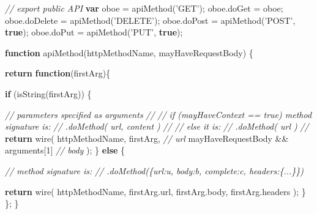\documentclass[]{article}
\newenvironment{Shaded}{}{}
\newcommand{\KeywordTok}[1]{\textcolor[rgb]{0.00,0.44,0.13}{\textbf{{#1}}}}
\newcommand{\DecValTok}[1]{\textcolor[rgb]{0.25,0.63,0.44}{{#1}}}
\newcommand{\StringTok}[1]{\textcolor[rgb]{0.25,0.44,0.63}{{#1}}}
\newcommand{\CommentTok}[1]{\textcolor[rgb]{0.38,0.63,0.69}{\textit{{#1}}}}
\newcommand{\OtherTok}[1]{\textcolor[rgb]{0.00,0.44,0.13}{{#1}}}
\newcommand{\FunctionTok}[1]{\textcolor[rgb]{0.02,0.16,0.49}{{#1}}}
\newcommand{\NormalTok}[1]{{#1}}
\begin{document}
\begin{Shaded}
\begin{Highlighting}[]
\CommentTok{// export public API}
\KeywordTok{var} \NormalTok{oboe = }\FunctionTok{apiMethod}\NormalTok{(}\StringTok{'GET'}\NormalTok{);}
\OtherTok{oboe}\NormalTok{.}\FunctionTok{doGet}    \NormalTok{= oboe;}
\OtherTok{oboe}\NormalTok{.}\FunctionTok{doDelete} \NormalTok{= }\FunctionTok{apiMethod}\NormalTok{(}\StringTok{'DELETE'}\NormalTok{);}
\OtherTok{oboe}\NormalTok{.}\FunctionTok{doPost}   \NormalTok{= }\FunctionTok{apiMethod}\NormalTok{(}\StringTok{'POST'}\NormalTok{, }\KeywordTok{true}\NormalTok{);}
\OtherTok{oboe}\NormalTok{.}\FunctionTok{doPut}    \NormalTok{= }\FunctionTok{apiMethod}\NormalTok{(}\StringTok{'PUT'}\NormalTok{, }\KeywordTok{true}\NormalTok{);}

\KeywordTok{function} \FunctionTok{apiMethod}\NormalTok{(httpMethodName, mayHaveRequestBody) \{}
               
   \KeywordTok{return} \KeywordTok{function}\NormalTok{(firstArg)\{}
           
      \KeywordTok{if} \NormalTok{(}\FunctionTok{isString}\NormalTok{(firstArg)) \{}
      
         \CommentTok{// parameters specified as arguments}
         \CommentTok{//}
         \CommentTok{//  if (mayHaveContext == true) method signature is:}
         \CommentTok{//     .doMethod( url, content )}
         \CommentTok{//}
         \CommentTok{//  else it is:}
         \CommentTok{//     .doMethod( url )            }
         \CommentTok{//                                }
         \KeywordTok{return} \FunctionTok{wire}\NormalTok{(}
                  \NormalTok{httpMethodName,}
                  \NormalTok{firstArg,                                  }\CommentTok{// url}
                  \NormalTok{mayHaveRequestBody && arguments[}\DecValTok{1}\NormalTok{]         }\CommentTok{// body}
         \NormalTok{);}
      \NormalTok{\} }\KeywordTok{else} \NormalTok{\{}
      
         \CommentTok{// method signature is:}
         \CommentTok{//    .doMethod(\{url:u, body:b, complete:c, headers:\{...\}\})}
         
         \KeywordTok{return} \FunctionTok{wire}\NormalTok{(   }
                  \NormalTok{httpMethodName,}
                  \OtherTok{firstArg}\NormalTok{.}\FunctionTok{url}\NormalTok{,}
                  \OtherTok{firstArg}\NormalTok{.}\FunctionTok{body}\NormalTok{,}
                  \OtherTok{firstArg}\NormalTok{.}\FunctionTok{headers} 
         \NormalTok{);}
      \NormalTok{\}}
   \NormalTok{\};}
\NormalTok{\}   }
\end{Highlighting}
\end{Shaded}
\end{document}
